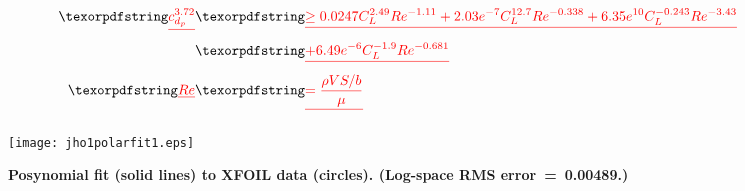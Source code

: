 \DIFdelbegin \begin{eqnarray*}
        \DIFdel{\label{e:aerodragprof}
        c_{d_p}^{3.72} }&\DIFdel{\geq 0.0247C_L^{2.49}Re^{-1.11} + 2.03e^{-7}C_L^{12.7}Re^{-0.338} + 6.35e^{10}C_L^{-0.243}Re^{-3.43} \nonumber }\\
                       &\DIFdel{+ 6.49e^{-6}C_L^{-1.9}Re^{-0.681} }\\
        \DIFdel{Re }&\DIFdel{= \frac{\rho V S/b}{\mu}
    }\end{eqnarray*}
\DIFdelend %

\begin{figure}[H]
	\begin{center}
	\DIFdelbeginFL %
\DIFdelendFL \DIFaddbeginFL \texttt{[image: jho1polarfit1.eps]}
    \DIFaddendFL \caption{\textbf{Posynomial fit (solid lines) to XFOIL data (circles).  (Log-space RMS error~=~0.00489.)}}
	\label{f:JH01polar}
	\end{center}
\end{figure}

